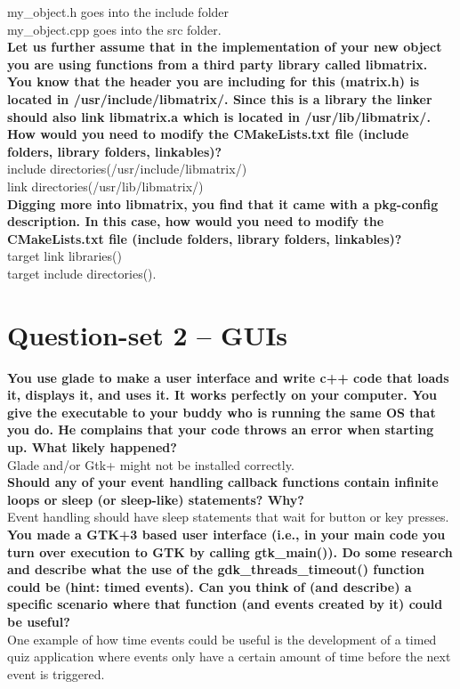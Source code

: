 \documentclass{article}
\begin{document}
my\_object.h goes into the include folder \\ my\_object.cpp goes into the src folder. \\


\textbf{Let us further assume that in the implementation of your new object you are using functions from a third party library called libmatrix. You know that the header you are including for this (matrix.h) is located in /usr/include/libmatrix/. Since this is a library the linker should also link libmatrix.a which is located in /usr/lib/libmatrix/. How would you need to modify the CMakeLists.txt file (include folders, library folders, linkables)?}\\

include directories(/usr/include/libmatrix/) \\ link directories(/usr/lib/libmatrix/)\\

\textbf{Digging more into libmatrix, you find that it came with a pkg-config description. In this case, how would you need to modify the CMakeLists.txt file (include folders, library folders, linkables)?}\\

target link libraries() \\ target include directories(). \\

\section{Question-set 2 -- GUIs}
\textbf{You use glade to make a user interface and write c++ code that loads it, displays it, and uses it. It works perfectly on your computer. You give the executable to your buddy who is running the same OS that you do. He complains that your code throws an error when starting up. What likely happened? }\\

Glade and/or Gtk+ might not be installed correctly. \\


\textbf{Should any of your event handling callback functions contain infinite loops or sleep (or sleep-like) statements? Why? }\\

Event handling should have sleep statements that wait for button or key presses. \\

\textbf{You made a GTK+3 based user interface (i.e., in your main code you turn over execution to GTK by calling gtk\_main()). Do some research and describe what the use of the gdk\_threads\_timeout() function could be (hint: timed events). Can you think of (and describe) a specific scenario where that function (and events created by it) could be useful?}\\

One example of how time events could be useful is the development of a timed quiz application where events only have a certain amount of time before the next event is triggered. \\
\end{document}
